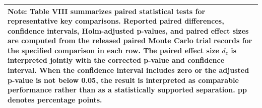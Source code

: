 \begin{table}[t]
\begin{tabular}{lllllllllll}
\hline
\multicolumn{11}{p{0.98\linewidth}}{\footnotesize Note: Table VIII summarizes paired statistical tests for representative key comparisons. Reported paired differences, confidence intervals, Holm-adjusted p-values, and paired effect sizes are computed from the released paired Monte Carlo trial records for the specified comparison in each row. The paired effect size \(d_z\) is interpreted jointly with the corrected p-value and confidence interval. When the confidence interval includes zero or the adjusted p-value is not below 0.05, the result is interpreted as comparable performance rather than as a statistically supported separation. pp denotes percentage points.} \\
\hline
\end{tabular}
\end{table}
